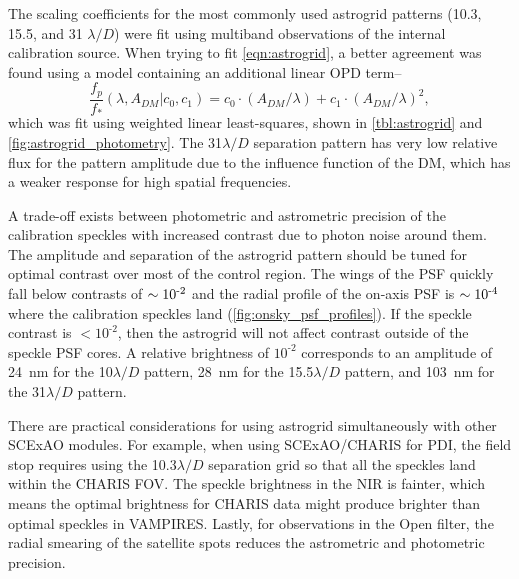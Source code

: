 The scaling coefficients for the most commonly used astrogrid patterns (10.3, 15.5, and 31 $\lambda/D$) were fit using multiband observations of the internal calibration source. When trying to fit \autoref{eqn:astrogrid}, a better agreement was found using a model containing an additional linear OPD term--
\begin{equation}
    \label{eqn:astrogridmod}
    \frac{f_p}{f_*}\left( \lambda, A_{DM} | c_0, c_1 \right) = c_0 \cdot \left(A_{DM} / \lambda\right) + c_1 \cdot \left(A_{DM} / \lambda\right)^2,
\end{equation}
which was fit using weighted linear least-squares, shown in \autoref{tbl:astrogrid} and \autoref{fig:astrogrid_photometry}. The 31$\lambda/D$ separation pattern has very low relative flux for the pattern amplitude due to the influence function of the DM, which has a weaker response for high spatial frequencies.

A trade-off exists between photometric and astrometric precision of the calibration speckles with increased contrast due to photon noise around them. The amplitude and separation of the astrogrid pattern should be tuned for optimal contrast over most of the control region. The wings of the PSF quickly fall below contrasts of $\sim10^{\text -2}$ and the radial profile of the on-axis PSF is $\sim10^{\text -4}$ where the calibration speckles land (\autoref{fig:onsky_psf_profiles}). If the speckle contrast is $<10^{\text{-}2}$, then the astrogrid will not affect contrast outside of the speckle PSF cores. A relative brightness of $10^{\text{-}2}$ corresponds to an amplitude of \SI{24}{\nano\meter} for the 10$\lambda/D$ pattern, \SI{28}{\nano\meter} for the 15.5$\lambda/D$ pattern, and \SI{103}{\nano\meter} for the 31$\lambda/D$ pattern.

There are practical considerations for using astrogrid simultaneously with other SCExAO modules. For example, when using SCExAO/CHARIS for PDI, the field stop requires using the 10.3$\lambda/D$ separation grid so that all the speckles land within the CHARIS FOV. The speckle brightness in the NIR is fainter, which means the optimal brightness for CHARIS data might produce brighter than optimal speckles in VAMPIRES. Lastly, for observations in the Open filter, the radial smearing of the satellite spots reduces the astrometric and photometric precision.

